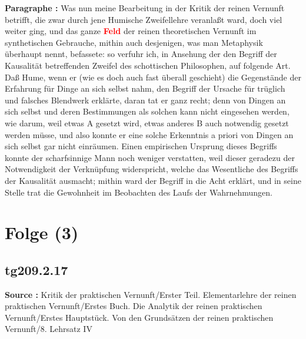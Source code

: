 \documentclass[a4paper,12pt,twoside]{book}
\newcommand{\match}[1]{\textcolor{red}{\textbf{#1}}}
\newcommand{\unnumberedsection}[1]{
	\section*{#1}
	\addcontentsline{toc}{section}{#1}
	\markright{#1}
}
\begin{document}
	\noindent\textbf{Paragraphe : }Was nun meine Bearbeitung in der Kritik der reinen Vernunft betrifft, die zwar durch jene Humische Zweifellehre veranlaßt ward, doch viel weiter ging, und das ganze \match{Feld} der reinen theoretischen Vernunft im synthetischen Gebrauche, mithin auch desjenigen, was man Metaphysik überhaupt nennt, befassete: so verfuhr ich, in Ansehung der den Begriff der Kausalität betreffenden Zweifel des schottischen Philosophen, auf folgende Art. Daß Hume, wenn er (wie es doch auch fast überall geschieht) die Gegenstände der Erfahrung für Dinge an sich selbst nahm, den Begriff der Ursache für trüglich und falsches Blendwerk erklärte, daran tat er ganz recht; denn von Dingen an sich selbst und deren Bestimmungen als solchen kann nicht eingesehen werden, wie darum, weil etwas A gesetzt wird, etwas anderes B auch notwendig gesetzt werden müsse, und also konnte er eine solche Erkenntnis a priori von Dingen an sich selbst gar nicht einräumen. Einen empirischen Ursprung dieses Begriffs konnte der scharfsinnige Mann noch weniger verstatten, weil dieser geradezu der Notwendigkeit der Verknüpfung widerspricht, welche das Wesentliche des Begriffs der Kausalität ausmacht; mithin ward der Begriff in die Acht erklärt, und in seine Stelle  trat die Gewohnheit im Beobachten des Laufs der Wahrnehmungen. 
	
	\unnumberedsection{Folge (3)} 
	\subsection*{tg209.2.17} 
	\textbf{Source : }Kritik der praktischen Vernunft/Erster Teil. Elementarlehre der reinen praktischen Vernunft/Erstes Buch. Die Analytik der reinen praktischen Vernunft/Erstes Hauptstück. Von den Grundsätzen der reinen praktischen Vernunft/8. Lehrsatz IV\\  
	
\end{document}
